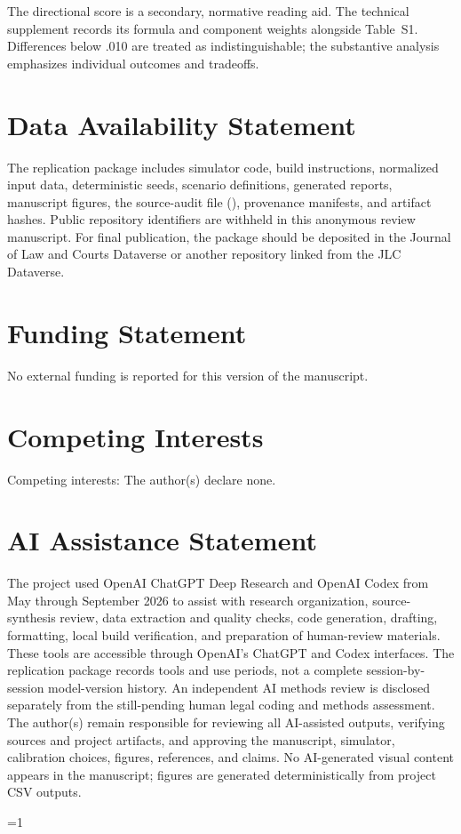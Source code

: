 \documentclass[
    journal=jlc,
    manuscript=research-article,
    year=2026,
  ]{cup-journal}
\def\paperusescup{1}
\def\paperusescup{0}
\begin{document}
The directional score is a secondary, normative reading aid. The technical supplement records its formula and component weights alongside Table~S1. Differences below .010 are treated as indistinguishable; the substantive analysis emphasizes individual outcomes and tradeoffs.

\section*{Data Availability Statement}

The replication package includes simulator code, build instructions, normalized input data, deterministic seeds, scenario definitions, generated reports, manuscript figures, the source-audit file (), provenance manifests, and artifact hashes. Public repository identifiers are withheld in this anonymous review manuscript. For final publication, the package should be deposited in the Journal of Law and Courts Dataverse or another repository linked from the JLC Dataverse.

\section*{Funding Statement}

No external funding is reported for this version of the manuscript.

\section*{Competing Interests}

Competing interests: The author(s) declare none.

\section*{AI Assistance Statement}

The project used OpenAI ChatGPT Deep Research and OpenAI Codex from May through September 2026 to assist with research organization, source-synthesis review, data extraction and quality checks, code generation, drafting, formatting, local build verification, and preparation of human-review materials. These tools are accessible through OpenAI's ChatGPT and Codex interfaces. The replication package records tools and use periods, not a complete session-by-session model-version history. An independent AI methods review is disclosed separately from the still-pending human legal coding and methods assessment. The author(s) remain responsible for reviewing all AI-assisted outputs, verifying sources and project artifacts, and approving the manuscript, simulator, calibration choices, figures, references, and claims. No AI-generated visual content appears in the manuscript; figures are generated deterministically from project CSV outputs.

\ifnum\paperusescup=1
  \printbibliography
\else
  
  
\fi
\end{document}
